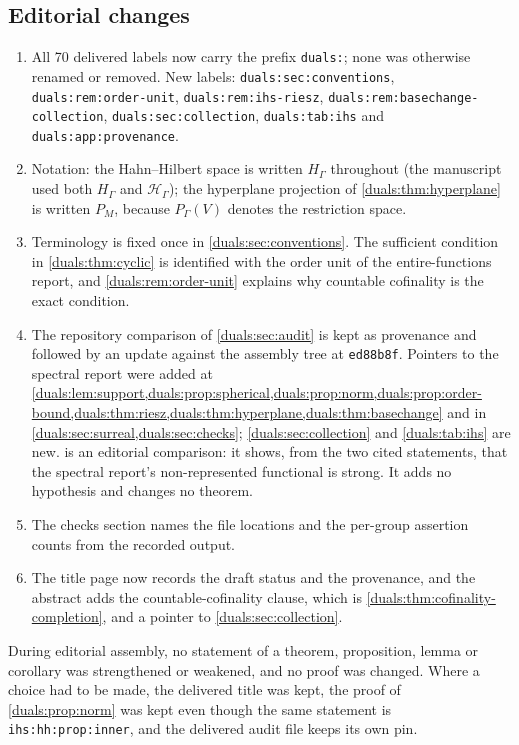 \documentclass[11pt,letterpaper]{article}
\numberwithin{equation}{section}
\theoremstyle{definition}
\theoremstyle{remark}
\newcommand{\ihs}[1]{\texttt{ihs:#1}}
\begin{document}
\subsection{Editorial changes}
\begin{enumerate}
\item {\raggedright All 70 delivered labels now carry the prefix \texttt{duals:}; none was
 otherwise renamed or removed. New labels:
 \texttt{duals:sec:conventions}, \texttt{duals:rem:order-unit},
 \texttt{duals:rem:ihs-riesz}, \texttt{duals:rem:basechange-collection},
 \texttt{duals:sec:collection}, \texttt{duals:tab:ihs} and
 \texttt{duals:app:provenance}.\par}
\item Notation: the Hahn--Hilbert space is written $H_\Gamma$ throughout
 (the manuscript used both $H_\Gamma$ and $\mathcal H_\Gamma$); the
 hyperplane projection of \cref{duals:thm:hyperplane} is written $P_M$,
 because $P_\Gamma(V)$ denotes the restriction space.
\item Terminology is fixed once in \cref{duals:sec:conventions}. The
 sufficient condition in \cref{duals:thm:cyclic} is identified with the
 order unit of the entire-functions report, and
 \cref{duals:rem:order-unit} explains why countable cofinality is the exact
 condition.
\item The repository comparison of \cref{duals:sec:audit} is kept as
 provenance and followed by an update against the assembly tree at
 \texttt{ed88b8f}. Pointers
 to the spectral report were added at
 \cref{duals:lem:support,duals:prop:spherical,duals:prop:norm,duals:prop:order-bound,duals:thm:riesz,duals:thm:hyperplane,duals:thm:basechange}
 and in \cref{duals:sec:surreal,duals:sec:checks};
 \cref{duals:sec:collection} and \cref{duals:tab:ihs} are new.
  is an editorial comparison: it shows, from
 the two cited statements, that the spectral report's non-represented
 functional is strong. It adds no hypothesis and changes no theorem.
\item The checks section names the file locations and the per-group
 assertion counts from the recorded output.
\item The title page now records the draft status and the provenance, and
 the abstract adds the countable-cofinality clause, which is
 \cref{duals:thm:cofinality-completion}, and a pointer to
 \cref{duals:sec:collection}.
\end{enumerate}
During editorial assembly, no statement of a theorem, proposition, lemma
or corollary was strengthened or weakened, and no proof was changed. Where a choice had to
be made, the delivered title was kept, the proof of \cref{duals:prop:norm}
was kept even though the same statement is \ihs{hh:prop:inner}, and the
delivered audit file keeps its own pin.
\end{document}

